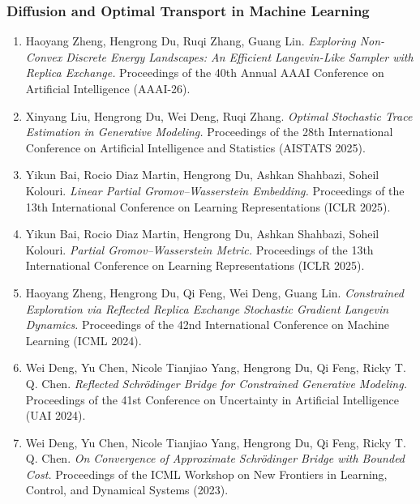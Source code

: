 \documentclass[12pt]{article}
\makeatletter
\newlength{\bibhang}
\newlength{\bibsep}
 {\@listi \global\bibsep\itemsep \global\advance\bibsep by\parsep}
\newenvironment{bibsection}%
        {\begin{enumerate}{}{%
       \setlength{\leftmargin}{\bibhang}%
       \setlength{\itemindent}{-\leftmargin}%
       \setlength{\itemsep}{\bibsep}%
       \setlength{\parsep}{\z@}%
        \setlength{\partopsep}{0pt}%
        \setlength{\topsep}{0pt}}}
        {\end{enumerate}\vspace{-.6\baselineskip}}
\makeatother
\begin{document}
\subsubsection*{\hspace{1in}Diffusion and Optimal Transport in Machine Learning}
\begin{bibsection}
\item Haoyang Zheng, Hengrong Du, Ruqi Zhang, Guang Lin. \emph{Exploring Non-Convex Discrete Energy Landscapes: An Efficient Langevin-Like Sampler with Replica Exchange.} Proceedings of the 40th Annual AAAI Conference on Artificial Intelligence (AAAI-26).
\item Xinyang Liu, Hengrong Du, Wei Deng, Ruqi Zhang. 
\emph{Optimal Stochastic Trace Estimation in Generative Modeling.} 
Proceedings of the 28th International Conference on Artificial Intelligence and Statistics (AISTATS 2025).

\item Yikun Bai, Rocio Diaz Martin, Hengrong Du, Ashkan Shahbazi, Soheil Kolouri. 
\emph{Linear Partial Gromov--Wasserstein Embedding.} 
Proceedings of the 13th International Conference on Learning Representations (ICLR 2025).

\item Yikun Bai, Rocio Diaz Martin, Hengrong Du, Ashkan Shahbazi, Soheil Kolouri. 
\emph{Partial Gromov--Wasserstein Metric.} 
Proceedings of the 13th International Conference on Learning Representations (ICLR 2025).

\item Haoyang Zheng, Hengrong Du, Qi Feng, Wei Deng, Guang Lin. 
\emph{Constrained Exploration via Reflected Replica Exchange Stochastic Gradient Langevin Dynamics.} 
Proceedings of the 42nd International Conference on Machine Learning (ICML 2024).

\item Wei Deng, Yu Chen, Nicole Tianjiao Yang, Hengrong Du, Qi Feng, Ricky T. Q. Chen. 
\emph{Reflected Schrödinger Bridge for Constrained Generative Modeling.} 
Proceedings of the 41st Conference on Uncertainty in Artificial Intelligence (UAI 2024).

\item Wei Deng, Yu Chen, Nicole Tianjiao Yang, Hengrong Du, Qi Feng, Ricky T. Q. Chen. 
\emph{On Convergence of Approximate Schr\"{o}dinger Bridge with Bounded Cost.} 
Proceedings of the ICML Workshop on New Frontiers in Learning, Control, and Dynamical Systems (2023).
\end{bibsection}
\end{document}
